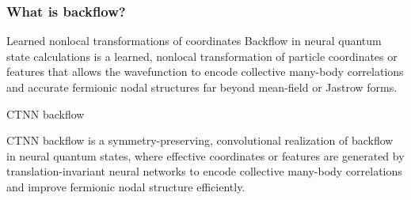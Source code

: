 \documentclass{beamer}
\begin{document}
\begin{frame}
\frametitle{What is backflow?}
\begin{alertblock}{Learned nonlocal transformations of coordinates}
Backflow in neural quantum state calculations is a learned, nonlocal
transformation of particle coordinates or features that allows the
wavefunction to encode collective many-body correlations and accurate
fermionic nodal structures far beyond mean-field or Jastrow forms.
\end{alertblock}
\begin{alertblock}{CTNN backflow}

CTNN backflow is a symmetry-preserving, convolutional realization of
backflow in neural quantum states, where effective coordinates or
features are generated by translation-invariant neural networks to
encode collective many-body correlations and improve fermionic nodal
structure efficiently.
\end{alertblock}

\end{frame}
\end{document}

